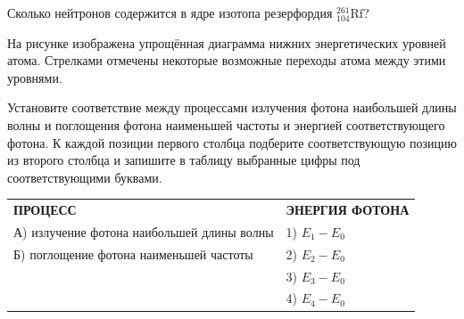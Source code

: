 \begin{taskbasic}[code={\label{task:nuclear_neutrons_rutherfordium}}]
Сколько нейтронов содержится в ядре изотопа резерфордия $^{261}_{104}\text{Rf}$?

\end{taskbasic}

\begin{taskbasic}[code={\label{task:atomic_levels_max_lambda_min_freq}}]
На рисунке изображена упрощённая диаграмма нижних энергетических уровней атома. Стрелками отмечены некоторые возможные переходы атома между этими уровнями.

Установите соответствие между процессами излучения фотона наибольшей длины волны и поглощения фотона наименьшей частоты и энергией соответствующего фотона. К каждой позиции первого столбца подберите соответствующую позицию из второго столбца и запишите в таблицу выбранные цифры под соответствующими буквами.

\nopagebreak\smallskip
\begin{center}
\end{center}

\smallskip
\begin{tabular}{p{}p{}}
\textbf{ПРОЦЕСС} & \textbf{ЭНЕРГИЯ ФОТОНА} \\
А) излучение фотона наибольшей длины волны & 1) $E_1 - E_0$ \\
Б) поглощение фотона наименьшей частоты & 2) $E_2 - E_0$ \\
& 3) $E_3 - E_0$ \\
& 4) $E_4 - E_0$
\end{tabular}

\end{taskbasic}

